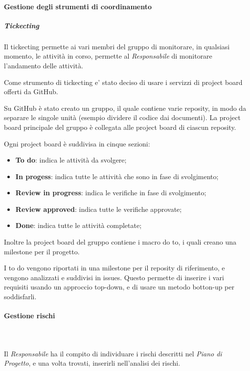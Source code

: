    			\paragraph{Gestione degli strumenti di coordinamento}
   				\subparagraph{Tickecting}
   					Il tickecting permette ai vari membri del gruppo di monitorare, in qualsiasi momento, le attività in corso, permette al \textit{Responsabile} di monitorare l'andamento delle attività.

   					Come strumento di tickecting e' stato deciso di usare i servizzi di project board offerti da GitHub.

   					Su GitHub è stato creato un gruppo, il quale contiene varie reposity, in modo da separare le singole unità (esempio dividere il codice dai documenti).
   					La project board principale del gruppo è collegata  alle project board di ciascun reposity.

   					Ogni project board è suddivisa in cinque sezioni:
   					\begin{itemize}
   						\item \textbf{To do}: indica le attività da svolgere;
   						\item \textbf{In progess}: indica tutte le attività che sono in fase di svolgimento;
   						\item \textbf{Review in progress}: indica le verifiche in fase di svolgimento;
   						\item \textbf{Review approved}: indica tutte le verifiche approvate;
   						\item \textbf{Done}: indica tutte le attività completate;
   					\end{itemize}
   					Inoltre la project board del gruppo contiene i macro do to, i quali creano una milestone per il progetto.

   					I to do vengono riportati in una milestone per il reposity di riferimento, e vengono analizzati e suddivisi in issues. Questo permette di inserire i vari requisiti usando un approccio top-down, e di usare un metodo botton-up per soddisfarli.
   			\paragraph{Gestione rischi}\mbox{}\\ \mbox{}\\
   				Il \textit{Responsabile} ha il compito di individuare i rischi descritti nel \textit{Piano di Progetto}, e una volta trovati, inserirli nell'analisi dei rischi.

